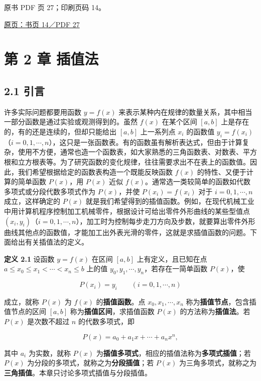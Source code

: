\clearpage

原书 PDF 页 27；印刷页码 14。

\href{source-images/pdf-027.jpeg}{原页：书页 14／PDF 27}

\section{第 2 章 插值法}\label{ch02a-ux7b2c-2-ux7ae0-ux63d2ux503cux6cd5}

\subsection{2.1 引言}\label{ch02a-ux5f15ux8a00}

许多实际问题都要用函数 \(y=f(x)\) 来表示某种内在规律的数量关系，其中相当一部分函数是通过实验或观测得到的。虽然 \(f(x)\) 在某个区间 \([a,b]\) 上是存在的，有的还是连续的，但却只能给出 \([a,b]\) 上一系列点 \(x_i\) 的函数值 \(y_i=f(x_i)\)（\(i=0,1,\cdots,n\)），这只是一张函数表。有的函数虽有解析表达式，但由于计算复杂，使用不方便，通常也造一个函数表，如大家熟悉的三角函数表、对数表、平方根和立方根表等。为了研究函数的变化规律，往往需要求出不在表上的函数值。因此，我们希望根据给定的函数表构造一个既能反映函数 \(f(x)\) 的特性、又便于计算的简单函数 \(P(x)\)，用 \(P(x)\) 近似 \(f(x)\)。通常选一类较简单的函数如代数多项式或分段代数多项式作为 \(P(x)\)，并使 \(P(x_i)=f(x_i)\) 对于 \(i=0,1,\cdots,n\) 成立，这样确定的 \(P(x)\) 就是我们希望得到的插值函数。例如，在现代机械工业中用计算机程序控制加工机械零件，根据设计可给出零件外形曲线的某些型值点 \((x_i,y_i)\)（\(i=0,1,\cdots,n\)），加工时为控制每步走刀方向及步数，就要算出零件外形曲线其他点的函数值，才能加工出外表光滑的零件，这就是求插值函数的问题。下面给出有关插值法的定义。

\textbf{定义 2.1} 设函数 \(y=f(x)\) 在区间 \([a,b]\) 上有定义，且已知在点 \(a\le x_0\le x_1<\cdots<x_n\le b\) 上的值 \(y_0,y_1,\cdots,y_n\)，若存在一简单函数 \(P(x)\)，使

\[
P(x_i)=y_i\qquad (i=0,1,\cdots,n)
\tag{2.1.1}
\]

成立，就称 \(P(x)\) 为 \(f(x)\) 的\textbf{插值函数}。点 \(x_0,x_1,\cdots,x_n\) 称为\textbf{插值节点}，包含插值节点的区间 \([a,b]\) 称为\textbf{插值区间}，求插值函数 \(P(x)\) 的方法称为\textbf{插值法}。若 \(P(x)\) 是次数不超过 \(n\) 的代数多项式，即

\[
P(x)=a_0+a_1x+\cdots+a_nx^n,
\tag{2.1.2}
\]

其中 \(a_i\) 为实数，就称 \(P(x)\) 为\textbf{插值多项式}，相应的插值法称为\textbf{多项式插值}；若 \(P(x)\) 为分段的多项式，就称之为\textbf{分段插值}；若 \(P(x)\) 为三角多项式，就称之为\textbf{三角插值}。本章只讨论多项式插值与分段插值。

